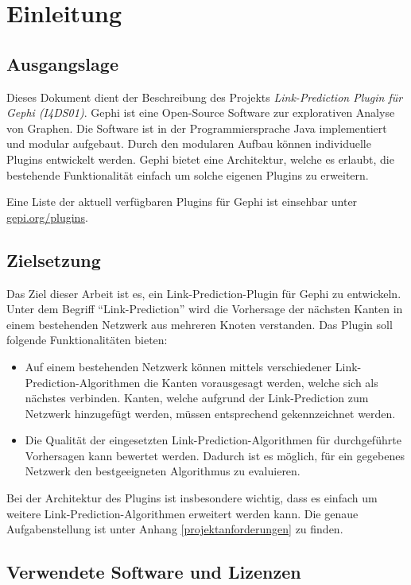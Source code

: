 \chapter{Einleitung}
\section{Ausgangslage}
Dieses Dokument dient der Beschreibung des Projekts \textit{Link-Prediction Plugin für Gephi (I4DS01)}.
Gephi ist eine Open-Source Software zur explorativen Analyse von Graphen. Die Software ist in der Programmiersprache Java implementiert und modular aufgebaut. Durch den modularen Aufbau können individuelle Plugins entwickelt werden. Gephi bietet eine Architektur, welche es erlaubt, die bestehende Funktionalität einfach um solche eigenen Plugins zu erweitern.

Eine Liste der aktuell verfügbaren Plugins für Gephi ist einsehbar unter \href{https://gephi.org/plugins}{gepi.org/plugins}.

\section{Zielsetzung}
Das Ziel dieser Arbeit ist es, ein Link-Prediction-Plugin für Gephi zu entwickeln. Unter dem Begriff ``Link-Prediction'' wird die Vorhersage der nächsten Kanten in einem bestehenden Netzwerk aus mehreren Knoten verstanden.
Das Plugin soll folgende Funktionalitäten bieten:

\begin{itemize}
    \item Auf einem bestehenden Netzwerk können mittels verschiedener Link-Prediction-Algorithmen die Kanten vorausgesagt werden, welche sich als nächstes verbinden. Kanten, welche aufgrund der Link-Prediction zum Netzwerk hinzugefügt werden, müssen entsprechend gekennzeichnet werden.
    \item Die Qualität der eingesetzten Link-Prediction-Algorithmen für durchgeführte Vorhersagen kann bewertet werden. Dadurch ist es möglich, für ein gegebenes Netzwerk den bestgeeigneten Algorithmus zu evaluieren.
\end{itemize}

Bei der Architektur des Plugins ist insbesondere wichtig, dass es einfach um weitere Link-Prediction-Algorithmen erweitert werden kann.
Die genaue Aufgabenstellung ist unter Anhang \ref{projektanforderungen} zu finden.

\section{Verwendete Software und Lizenzen}

